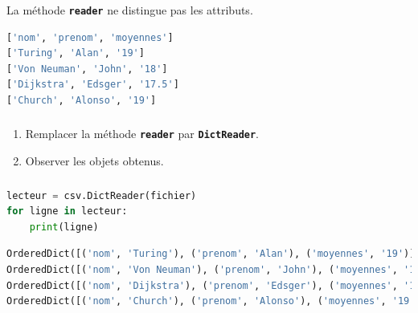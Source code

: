 \documentclass[svgnames,11pt]{beamer}
\begin{document}
\begin{frame}[fragile]
    \frametitle{}

    \begin{aretenir}[Remarque]
        La méthode \textbf{\texttt{reader}} ne distingue pas les attributs.
    \end{aretenir}
    \begin{center}
        \begin{lstlisting}[language=Python , basicstyle=\ttfamily\small, xleftmargin=2em, xrightmargin=2em]
['nom', 'prenom', 'moyennes']
['Turing', 'Alan', '19']
['Von Neuman', 'John', '18']
['Dijkstra', 'Edsger', '17.5']
['Church', 'Alonso', '19'] 
\end{lstlisting}
    \end{center}
\end{frame}
\begin{frame}
    \frametitle{}

    \begin{activite}
        \begin{enumerate}
            \item Remplacer la méthode \textbf{\texttt{reader}} par \textbf{\texttt{DictReader}}.
            \item Observer les objets obtenus.
        \end{enumerate}
    \end{activite}

\end{frame}
\begin{frame}[fragile]
    \frametitle{}

    \begin{center}
        \begin{lstlisting}[language=Python , basicstyle=\ttfamily\small, xleftmargin=2em, xrightmargin=2em]
lecteur = csv.DictReader(fichier)
for ligne in lecteur:
    print(ligne)
\end{lstlisting}
    \end{center}
    \begin{center}
        \begin{lstlisting}[language=Python , basicstyle=\ttfamily\small, xleftmargin=2em, xrightmargin=2em]
OrderedDict([('nom', 'Turing'), ('prenom', 'Alan'), ('moyennes', '19')])
OrderedDict([('nom', 'Von Neuman'), ('prenom', 'John'), ('moyennes', '18')])
OrderedDict([('nom', 'Dijkstra'), ('prenom', 'Edsger'), ('moyennes', '17.5')])
OrderedDict([('nom', 'Church'), ('prenom', 'Alonso'), ('moyennes', '19')])
\end{lstlisting}
        \label{CODE}
    \end{center}
\end{frame}
\end{document}
